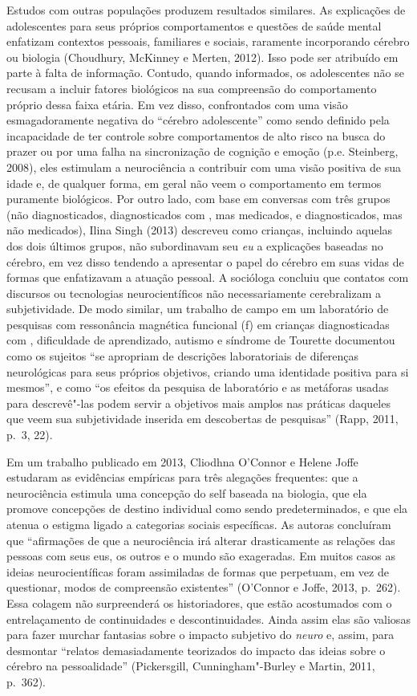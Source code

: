 Estudos com outras populações produzem resultados similares. As
explicações de adolescentes para seus próprios comportamentos e questões
de saúde mental enfatizam contextos pessoais, familiares e sociais,
raramente incorporando cérebro ou biologia (Choudhury, McKinney e
Merten, 2012). Isso pode ser atribuído em parte à falta de informação.
Contudo, quando informados, os adolescentes não se recusam a incluir
fatores biológicos na sua compreensão do comportamento próprio dessa
faixa etária. Em vez disso, confrontados com uma visão esmagadoramente
negativa do ``cérebro adolescente'' como sendo definido pela
incapacidade de ter controle sobre comportamentos de alto risco na busca
do prazer ou por uma falha na sincronização de cognição e emoção (p.e.
Steinberg, 2008), eles estimulam a neurociência a contribuir com uma
visão positiva de sua idade e, de qualquer forma, em geral não veem o
comportamento em termos puramente biológicos. Por outro lado, com base
em conversas com três grupos (não diagnosticados, diagnosticados com
, mas medicados, e diagnosticados, mas não medicados), Ilina Singh
(2013) descreveu como crianças, incluindo aquelas dos dois últimos
grupos, não subordinavam seu \emph{eu} a explicações baseadas no
cérebro, em vez disso tendendo a apresentar o papel do cérebro em suas
vidas de formas que enfatizavam a atuação pessoal. A socióloga concluiu
que contatos com discursos ou tecnologias neurocientíficos não
necessariamente cerebralizam a subjetividade. De modo similar, um
trabalho de campo em um laboratório de pesquisas com ressonância
magnética funcional (f) em crianças diagnosticadas com ,
dificuldade de aprendizado, autismo e síndrome de Tourette documentou
como os sujeitos ``se apropriam de descrições laboratoriais de
diferenças neurológicas para seus próprios objetivos, criando uma
identidade positiva para si mesmos'', e como ``os efeitos da pesquisa de
laboratório e as metáforas usadas para descrevê"-las podem servir a
objetivos mais amplos nas práticas daqueles que veem sua subjetividade
inserida em descobertas de pesquisas'' (Rapp, 2011, p.~3, 22).

Em um trabalho publicado em 2013, Cliodhna O'Connor e Helene Joffe
estudaram as evidências empíricas para três alegações frequentes: que a
neurociência estimula uma concepção do self baseada na biologia, que ela
promove concepções de destino individual como sendo predeterminados, e
que ela atenua o estigma ligado a categorias sociais específicas. As
autoras concluíram que ``afirmações de que a neurociência irá alterar
drasticamente as relações das pessoas com seus eus, os outros e o mundo
são exageradas. Em muitos casos as ideias neurocientíficas foram
assimiladas de formas que perpetuam, em vez de questionar, modos de
compreensão existentes'' (O'Connor e Joffe, 2013, p.~262). Essa colagem
não surpreenderá os historiadores, que estão acostumados com o
entrelaçamento de continuidades e descontinuidades. Ainda assim elas são
valiosas para fazer murchar fantasias sobre o impacto subjetivo do
\emph{neuro} e, assim, para desmontar ``relatos demasiadamente
teorizados do impacto das ideias sobre o cérebro na pessoalidade''
(Pickersgill, Cunningham"-Burley e Martin, 2011, p.~362).

